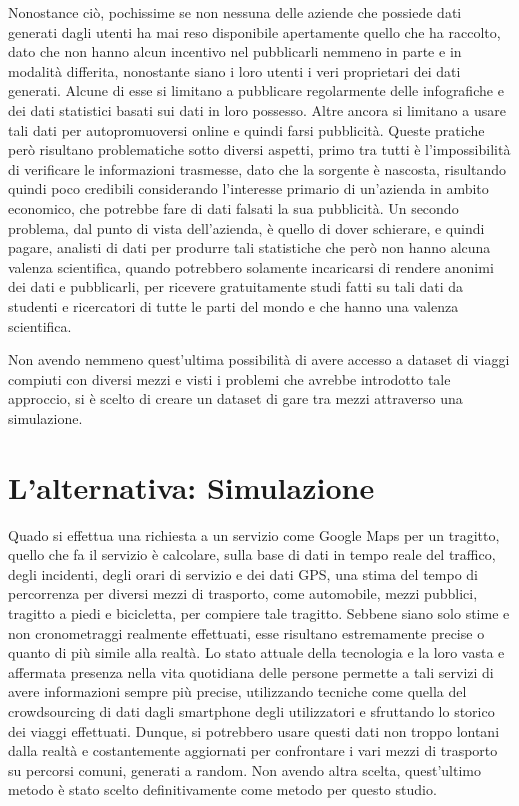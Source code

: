 Nonostance ciò, pochissime se non nessuna delle aziende che possiede dati generati dagli utenti ha mai reso disponibile apertamente quello che ha raccolto, dato che non hanno alcun incentivo nel pubblicarli nemmeno in parte e in modalità differita, nonostante siano i loro utenti i veri proprietari dei dati generati. Alcune di esse si limitano a pubblicare regolarmente delle infografiche e dei dati statistici basati sui dati in loro possesso. Altre ancora si limitano a usare tali dati per autopromuoversi online e quindi farsi pubblicità. Queste pratiche però risultano problematiche sotto diversi aspetti, primo tra tutti è l'impossibilità di verificare le informazioni trasmesse, dato che la sorgente è nascosta, risultando quindi poco credibili considerando l'interesse primario di un'azienda in ambito economico, che potrebbe fare di dati falsati la sua pubblicità. Un secondo problema, dal punto di vista dell'azienda, è quello di dover schierare, e quindi pagare, analisti di dati per produrre tali statistiche che però non hanno alcuna valenza scientifica, quando potrebbero solamente incaricarsi di rendere anonimi dei dati e pubblicarli, per ricevere gratuitamente studi fatti su tali dati da studenti e ricercatori di tutte le parti del mondo e che hanno una valenza scientifica.

Non avendo nemmeno quest'ultima possibilità di avere accesso a dataset di viaggi compiuti con diversi mezzi e visti i problemi che avrebbe introdotto tale approccio, si è scelto di creare un dataset di gare tra mezzi attraverso una simulazione.

\section{L'alternativa: Simulazione}

Quado si effettua una richiesta a un servizio come Google Maps per un tragitto, quello che fa il servizio è calcolare, sulla base di dati in tempo reale del traffico, degli incidenti, degli orari di servizio e dei dati GPS, una stima del tempo di percorrenza per diversi mezzi di trasporto, come automobile, mezzi pubblici, tragitto a piedi e bicicletta, per compiere tale tragitto. Sebbene siano solo stime e non cronometraggi realmente effettuati, esse risultano estremamente precise o quanto di più simile alla realtà. Lo stato attuale della tecnologia e la loro vasta e affermata presenza nella vita quotidiana delle persone permette a tali servizi di avere informazioni sempre più precise, utilizzando tecniche come quella del crowdsourcing di dati dagli smartphone degli utilizzatori e sfruttando lo storico dei viaggi effettuati. Dunque, si potrebbero usare questi dati non troppo lontani dalla realtà e costantemente aggiornati per confrontare i vari mezzi di trasporto su percorsi comuni, generati a random. Non avendo altra scelta, quest'ultimo metodo è stato scelto definitivamente come metodo per questo studio.


